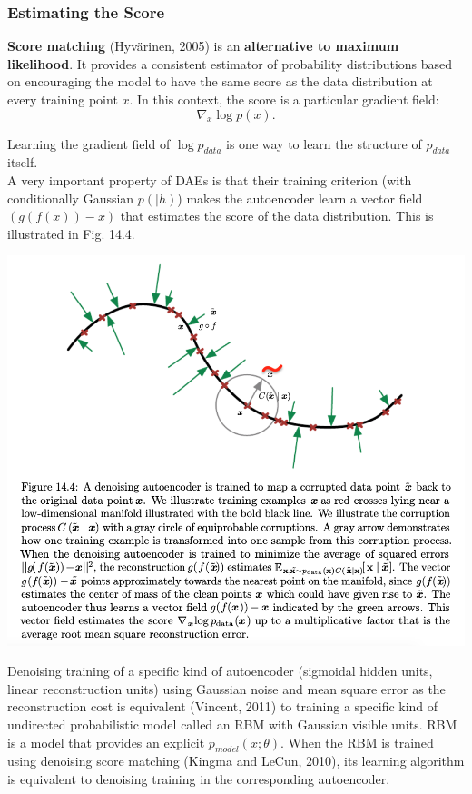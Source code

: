 \documentclass[11pt]{article}
\begin{document}
\subsubsection{Estimating the Score}
\label{sec:orgefa46a2}
\textbf{Score matching} (Hyvärinen, 2005) is an \textbf{alternative to maximum likelihood}. It provides a consistent estimator of probability distributions based on encouraging the model to have the same score as the data distribution at every training point \(x\). In this context, the score is a particular gradient field:\\
\begin{equation}
\nabla_x \log p(x).
\end{equation}

Learning the gradient field of \(\log p_{data}\) is one way to learn the structure of \(p_{data}\) itself.\\


A very important property of DAEs is that their training criterion (with conditionally Gaussian \(p(|h)\)) makes the autoencoder learn a vector field \((g(f(x)) − x)\) that estimates the score of the data distribution. This is illustrated in Fig. 14.4.\\

\begin{center}
\includegraphics[width=.9\linewidth]{pics/figure14.4-score-matching.png}
\end{center}

Denoising training of a specific kind of autoencoder (sigmoidal hidden units, linear reconstruction units) using Gaussian noise and mean square error as the reconstruction cost is equivalent (Vincent, 2011) to training a specific kind of undirected probabilistic model called an RBM with Gaussian visible units. RBM is a model that provides an explicit \(p_{model}(x;\theta)\). When the RBM is trained using denoising score matching (Kingma and LeCun, 2010), its learning algorithm is equivalent to denoising training in the corresponding autoencoder.\\
\end{document}
